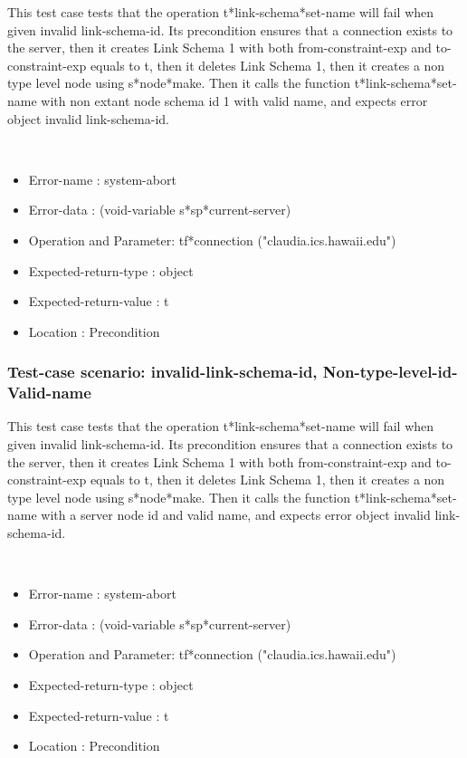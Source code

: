 This test case tests that the operation t*link-schema*set-name will fail when given invalid link-schema-id.
Its precondition ensures that a connection exists to the server, then it creates Link Schema 1 with both from-constraint-exp and to-constraint-exp equals to t, then it deletes Link Schema 1, then it creates a non type level node using s*node*make.
Then it calls the function t*link-schema*set-name  with non extant node schema id 1 with valid name, and expects error object invalid link-schema-id.



\
\begin {itemize}
\item 	Error-name             : system-abort
\item Error-data             : (void-variable s*sp*current-server)
\item Operation and Parameter: tf*connection ("claudia.ics.hawaii.edu")
\item Expected-return-type   : object
\item Expected-return-value  : t
\item Location               : Precondition



\end {itemize}
\subsubsection {Test-case scenario: invalid-link-schema-id, Non-type-level-id-Valid-name}


This test case tests that the operation t*link-schema*set-name will fail when given invalid link-schema-id.
Its precondition ensures that a connection exists to the server, then it creates Link Schema 1 with both from-constraint-exp and to-constraint-exp equals to t, then it deletes Link Schema 1, then it creates a non type level node using s*node*make.
Then it calls the function t*link-schema*set-name  with a server node id and valid name, and expects error object invalid link-schema-id.



\
\begin {itemize}
\item 	Error-name             : system-abort
\item Error-data             : (void-variable s*sp*current-server)
\item Operation and Parameter: tf*connection ("claudia.ics.hawaii.edu")
\item Expected-return-type   : object
\item Expected-return-value  : t
\item Location               : Precondition



\end {itemize}
